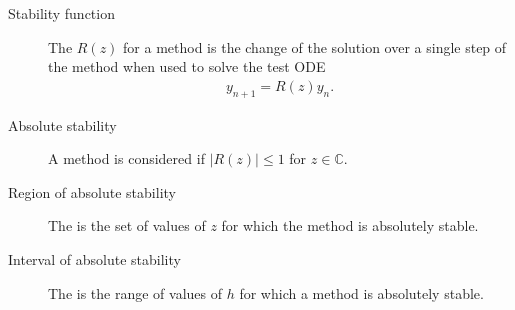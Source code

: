 \documentclass[letterpaper,10pt,english]{jupyterBook}
\begin{document}
\begin{description}
\item[{Stability function\label{\detokenize{8_Appendices/8.0_Cheat_sheet:term-Stability-function}}}] \leavevmode
\sphinxAtStartPar
The {\hyperref[\detokenize{4_Stability/4.1_Stability_functions:stability-function-definition}]{}} \(R(z)\) for a method is the change of the solution over a single step of the method when used to solve the test ODE
\begin{equation*}
\begin{split}y_{n+1} = R(z) y_n.\end{split}
\end{equation*}
\item[{Absolute stability\label{\detokenize{8_Appendices/8.0_Cheat_sheet:term-Absolute-stability}}}] \leavevmode
\sphinxAtStartPar
A method is considered {\hyperref[\detokenize{4_Stability/4.1_Stability_functions:absolute-stability-section}]{}} if \(|R(z)| \leq 1\) for \(z \in \mathbb{C}\).

\item[{Region of absolute stability\label{\detokenize{8_Appendices/8.0_Cheat_sheet:term-Region-of-absolute-stability}}}] \leavevmode
\sphinxAtStartPar
The {\hyperref[\detokenize{4_Stability/4.1_Stability_functions:region-of-absolute-stability-definition}]{}} is the set of values of \(z\) for which the method is absolutely stable.

\item[{Interval of absolute stability\label{\detokenize{8_Appendices/8.0_Cheat_sheet:term-Interval-of-absolute-stability}}}] \leavevmode
\sphinxAtStartPar
The {\hyperref[\detokenize{4_Stability/4.1_Stability_functions:interval-of-absolute-stability-section}]{}} is the range of values of \(h\) for which a method is absolutely stable.


\end{description}
\end{document}
